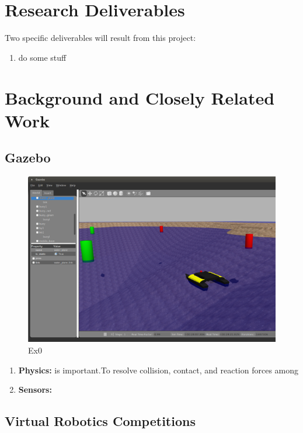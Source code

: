 \documentclass[11pt]{article}
\begin{document}
\section{Research Deliverables}
Two specific deliverables will result from this project:
\begin{enumerate}
\item do some stuff
\end{enumerate}

\section{Background and Closely Related Work}

\subsection{Gazebo}
\begin{figure}[h]
  \centering
  \includegraphics[width=.7\textwidth]{example.png}
  \caption{Ex0}
  \label{f:e0}
\end{figure}


\begin{enumerate}
\item {\bf Physics:} is important.To resolve collision, contact, and reaction forces among
\item {\bf Sensors:}
\end{enumerate}


\subsection{Virtual Robotics Competitions}
\end{document}

